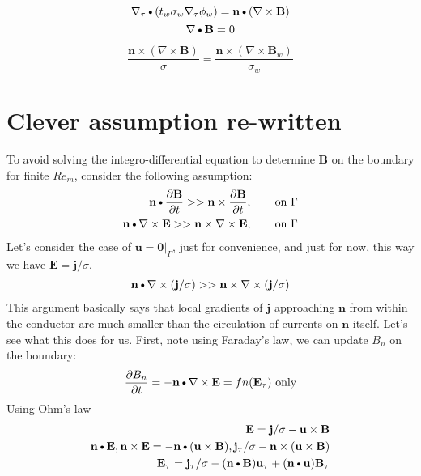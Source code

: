 \documentclass[11pt]{article}
\newcommand{\B}{\mathbf{B}}
\newcommand{\U}{\mathbf{u}}
\newcommand{\curl}{\nabla \times}
\newcommand{\PD}{\partial}
\newcommand{\J}{\mathbf{j}}
\newcommand{\E}{\mathbf{E}}
\newcommand{\N}{\mathbf{n}}
\newcommand{\DOT}{\text{\textbullet}}
\begin{document}
\begin{equation}
  \nabla_{\tau} \DOT (t_w \sigma_w \nabla_{\tau} \phi_w) = \N \DOT (\curl \B)
\end{equation}
\begin{equation}
  \nabla \DOT \B = 0
\end{equation}

\begin{equation}
  \frac{\N \times (\curl \B)}{\sigma} = \frac{\N \times (\curl \B_w)}{\sigma_w}
\end{equation}

\newpage
\section{Clever assumption re-written}
To avoid solving the integro-differential equation to determine $\B$ on the boundary for finite $Re_m$, consider the following assumption:
\begin{equation}\begin{aligned}
  \N \DOT \frac{\PD \B}{\PD t} >> \N \times \frac{\PD \B}{\PD t}, \qquad \text{on $\Gamma$} \\
  \N \DOT \curl \E >> \N \times \curl \E, \qquad \text{on $\Gamma$}
\end{aligned}\end{equation}
Let's consider the case of $\U = \mathbf{0}|_{\Gamma}$, just for convenience, and just for now, this way we have $\E = \J/\sigma$.
\begin{equation}\begin{aligned}
  \N \DOT \curl (\J/\sigma) >> \N \times \curl (\J/\sigma) \\
\end{aligned}\end{equation}
This argument basically says that local gradients of $\J$ approaching $\N$ from within the conductor are much smaller than the circulation of currents on $\N$ itself. Let's see what this does for us. First, note using Faraday's law, we can update $B_n$ on the boundary:
\begin{equation}\begin{aligned}
  \frac{\PD B_n}{\PD t} = - \N \DOT \curl \E = fn(\E_{\tau}) \text{ only}
\end{aligned}\end{equation}
Using Ohm's law
\begin{equation}\begin{aligned}
  \E = \J/\sigma - \U \times \B \\
  \N\DOT \E,\N \times \E = -\N \DOT (\U \times \B), \J_{\tau}/\sigma - \N \times (\U \times \B) \\
  \E_{\tau} = \J_{\tau}/\sigma - (\N \DOT \B) \U_{\tau} + (\N \DOT \U) \B_{\tau}
\end{aligned}\end{equation}
\end{document}
